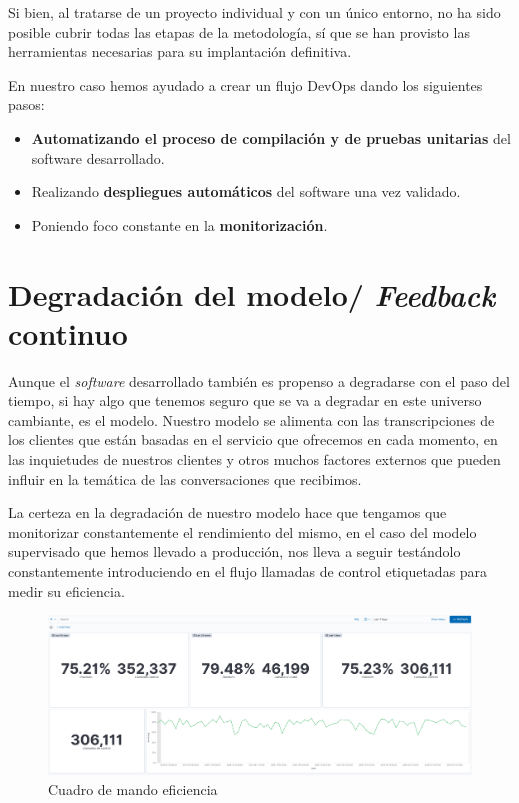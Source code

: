 Si bien, al tratarse de un proyecto individual y con un único entorno, no ha sido posible cubrir todas las etapas de la metodología, sí que se han provisto las herramientas necesarias para su implantación definitiva. 

En nuestro caso hemos ayudado a crear un flujo DevOps dando los siguientes pasos: 

\begin{itemize}
\item\textbf{ Automatizando el proceso de compilación y de pruebas unitarias}  del software desarrollado.
\item Realizando \textbf{despliegues automáticos} del software una vez validado.
\item Poniendo foco constante en la \textbf{monitorización}.
\end{itemize}


\section{Degradación del modelo/ \textit{Feedback} continuo}
\label{section:mant:efi}
Aunque el \textit{software} desarrollado también es propenso a degradarse con el paso del tiempo, si hay algo que tenemos seguro que se va a degradar en este universo cambiante, es el modelo. Nuestro modelo se alimenta con las transcripciones de los clientes que están basadas en el servicio que ofrecemos en cada momento, en las inquietudes de nuestros clientes y otros muchos factores externos que pueden influir en la temática de las conversaciones que recibimos.

La certeza en la degradación de nuestro modelo hace que tengamos que monitorizar constantemente el rendimiento del mismo, en el caso del modelo supervisado que hemos llevado a producción, nos lleva a seguir testándolo constantemente introduciendo en el flujo llamadas de control etiquetadas para medir su eficiencia.  




\begin{figure}[!ht]
	\centering
	\includegraphics[width=1\textwidth]{images/mant/cmeficiencia}
	\caption{Cuadro de mando eficiencia}
	\label{fig:cmeficiencia}
\end{figure}

